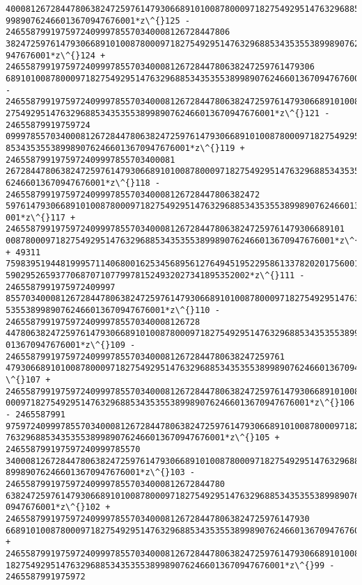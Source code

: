 \documentclass[11pt]{article}
\begin{document}
\begin{tcolorbox}[breakable, size=fbox, boxrule=.5pt, pad at break*=1mm, opacityfill=0]
\begin{Verbatim}[commandchars=\\\{\}]
40008126728447806382472597614793066891010087800097182754929514763296885343535538
99890762466013670947676001*z\^{}125 - 246558799197597240999785570340008126728447806
38247259761479306689101008780009718275492951476329688534353553899890762466013670
947676001*z\^{}124 + 24655879919759724099978557034000812672844780638247259761479306
689101008780009718275492951476329688534353553899890762466013670947676001*z\^{}123 -
24655879919759724099978557034000812672844780638247259761479306689101008780009718
275492951476329688534353553899890762466013670947676001*z\^{}121 - 24655879919759724
09997855703400081267284478063824725976147930668910100878000971827549295147632968
8534353553899890762466013670947676001*z\^{}119 + 2465587991975972409997855703400081
26728447806382472597614793066891010087800097182754929514763296885343535538998907
62466013670947676001*z\^{}118 - 246558799197597240999785570340008126728447806382472
59761479306689101008780009718275492951476329688534353553899890762466013670947676
001*z\^{}117 + 24655879919759724099978557034000812672844780638247259761479306689101
008780009718275492951476329688534353553899890762466013670947676001*z\^{}115 + 49311
75983951944819995711406800162534568956127649451952295861337820201756001943655098
5902952659377068707107799781524932027341895352002*z\^{}111 - 2465587991975972409997
85570340008126728447806382472597614793066891010087800097182754929514763296885343
53553899890762466013670947676001*z\^{}110 - 246558799197597240999785570340008126728
44780638247259761479306689101008780009718275492951476329688534353553899890762466
013670947676001*z\^{}109 - 24655879919759724099978557034000812672844780638247259761
479306689101008780009718275492951476329688534353553899890762466013670947676001*z
\^{}107 + 2465587991975972409997855703400081267284478063824725976147930668910100878
0009718275492951476329688534353553899890762466013670947676001*z\^{}106 - 2465587991
97597240999785570340008126728447806382472597614793066891010087800097182754929514
76329688534353553899890762466013670947676001*z\^{}105 + 246558799197597240999785570
34000812672844780638247259761479306689101008780009718275492951476329688534353553
899890762466013670947676001*z\^{}103 - 24655879919759724099978557034000812672844780
63824725976147930668910100878000971827549295147632968853435355389989076246601367
0947676001*z\^{}102 + 2465587991975972409997855703400081267284478063824725976147930
6689101008780009718275492951476329688534353553899890762466013670947676001*z\^{}101
+ 246558799197597240999785570340008126728447806382472597614793066891010087800097
18275492951476329688534353553899890762466013670947676001*z\^{}99 - 2465587991975972

\end{Verbatim}
\end{tcolorbox}
\end{document}
